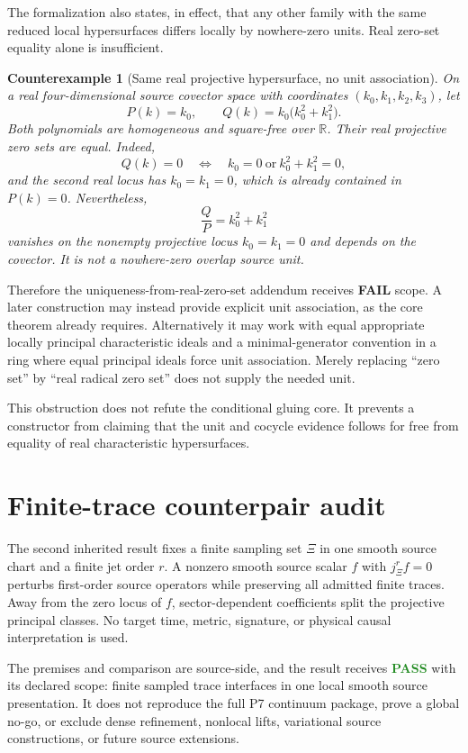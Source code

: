 \documentclass[11pt]{article}
\newtheorem{counterexample}{Counterexample}
\newcommand{\pass}{\textcolor{ForestGreen}{\textbf{PASS}}}
\newcommand{\fail}{\textcolor{BrickRed}{\textbf{FAIL}}}
\begin{document}
The formalization also states, in effect, that any other family with the same
reduced local hypersurfaces differs locally by nowhere-zero units.  Real
zero-set equality alone is insufficient.

\begin{counterexample}[Same real projective hypersurface, no unit association]
On a real four-dimensional source covector space with coordinates
$(k_0,k_1,k_2,k_3)$, let
\[
  P(k)=k_0,
  \qquad
  Q(k)=k_0\bigl(k_0^2+k_1^2\bigr).
\]
Both polynomials are homogeneous and square-free over $\mathbb{R}$.  Their
real projective zero sets are equal.  Indeed,
\[
 Q(k)=0
 \quad\Longleftrightarrow\quad
 k_0=0\ \text{or}\ k_0^2+k_1^2=0,
\]
and the second real locus has $k_0=k_1=0$, which is already contained in
$P(k)=0$.  Nevertheless,
\[
  \frac{Q}{P}=k_0^2+k_1^2
\]
vanishes on the nonempty projective locus $k_0=k_1=0$ and depends on the
covector.  It is not a nowhere-zero overlap source unit.
\end{counterexample}

Therefore the uniqueness-from-real-zero-set addendum receives
\fail{} scope.  A later construction may instead provide explicit unit
association, as the core theorem already requires.  Alternatively it may
work with equal appropriate locally principal characteristic ideals and a
minimal-generator convention in a ring where equal principal ideals force
unit association.  Merely replacing ``zero set'' by ``real radical zero set''
does not supply the needed unit.

This obstruction does not refute the conditional gluing core.  It prevents a
constructor from claiming that the unit and cocycle evidence follows for free
from equality of real characteristic hypersurfaces.

\section{Finite-trace counterpair audit}

The second inherited result fixes a finite sampling set $\Xi$ in one smooth
source chart and a finite jet order $r$.  A nonzero smooth source scalar $f$
with $j^r_{\Xi}f=0$ perturbs first-order source operators while preserving all
admitted finite traces.  Away from the zero locus of $f$, sector-dependent
coefficients split the projective principal classes.  No target time, metric,
signature, or physical causal interpretation is used.

The premises and comparison are source-side, and the result receives
\pass{} with its declared scope: finite sampled trace interfaces in one local
smooth source presentation.  It does not reproduce the full P7 continuum
package, prove a global no-go, or exclude dense refinement, nonlocal lifts,
variational source constructions, or future source extensions.
\end{document}
